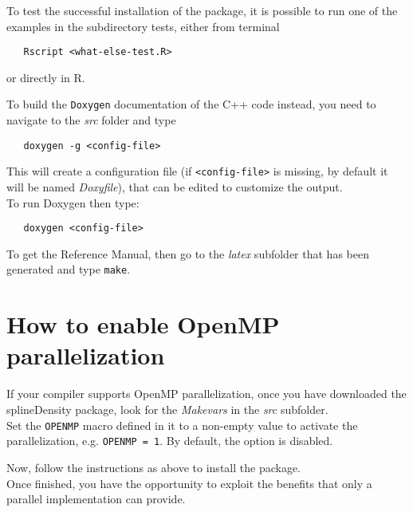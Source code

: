 To test the successful installation of the package, it is possible to run one of the examples in the subdirectory tests, either from terminal
\begin{verbatim}
   Rscript <what-else-test.R>
\end{verbatim}
or directly in R.

To build the \verb|Doxygen| documentation of the C++ code instead, you need to navigate to the \textit{src} folder and type 
\begin{verbatim}
   doxygen -g <config-file>
\end{verbatim}
This will create a configuration file (if \verb|<config-file>| is missing, by default it will be named \textit{Doxyfile}), that can be edited to customize the output. \\
To run Doxygen then type:
\begin{verbatim}
   doxygen <config-file>
\end{verbatim}
To get the Reference Manual, then go to the \textit{latex} subfolder that has been generated and type \verb|make|.




\section{How to enable OpenMP parallelization}
If your compiler supports OpenMP parallelization, once you have downloaded the splineDensity package, look for the \textit{Makevars} in the \textit{src} subfolder.\\
Set the \verb|OPENMP| macro defined in it to a non-empty value to activate the parallelization, e.g. \verb|OPENMP = 1|. By default, the option is disabled.

Now, follow the instructions as above to install the package. \\
Once finished, you have the opportunity to exploit the benefits that only a parallel implementation can provide.

